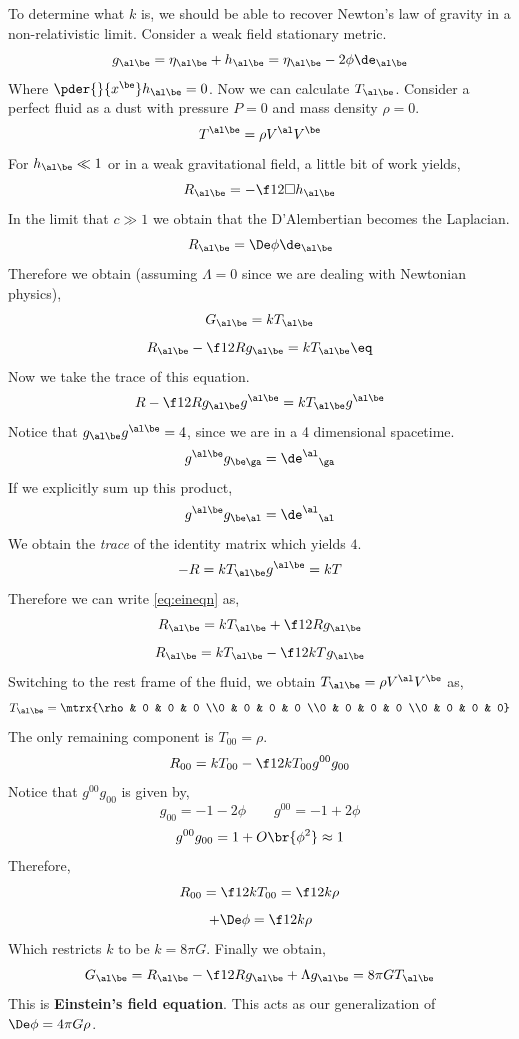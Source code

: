 \documentclass{article}
\begin{document}
To determine what $k$ is, we should be able to recover Newton's law of gravity in a non-relativistic limit. Consider a weak field stationary metric.
\[ g_{\al\be} = \eta_{\al\be} + h_{\al\be} = \eta_{\al\be} -2 \phi\de_{\al\be}\]
Where $\pder{}{x^\be} h_{\al\be} = 0$. Now we can calculate $T_{\al\be}$. Consider a perfect fluid as a dust with pressure $P= 0$ and mass density $\rho=0$.
\[ T^{\al\be} = \rho V^\al V^\be \]
For $h_{\al\be} \ll 1$ or in a weak gravitational field, a little bit of work yields,
\[ R_{\al\be} = -\f12 \Box h_{\al\be} \]
In the limit that $c \gg 1$ we obtain that the D'Alembertian becomes the Laplacian.
\[ R_{\al\be} = \De \phi \de_{\al\be} \]
Therefore we obtain (assuming $\Lambda = 0$ since we are dealing with Newtonian physics),
\[ G_{\al\be} = k T_{\al\be} \]
\[ R_{\al\be} - \f12 R g_{\al\be} = k T_{\al\be} \eq \label{eq:eineqn}\]
Now we take the trace of this equation.
\[ R - \f12 R g_{\al\be} g^{\al\be} = k T_{\al\be}g^{\al\be} \]
Notice that $g_{\al\be} g^{\al\be} = 4$, since we are in a 4 dimensional spacetime.
\[ g^{\al\be} g_{\be\ga} = {\de^\al}_{\ga} \]
If we explicitly sum up this product,
\[ g^{\al\be} g_{\be\al} = {\de^\al}_{\al} \]
We obtain the \textit{trace} of the identity matrix which yields $4$.
\[ -R = k T_{\al\be}g^{\al\be} = kT \]
Therefore we can write \eqref{eq:eineqn} as,
\[ R_{\al\be} = k T_{\al\be} + \f12 R g_{\al\be} \]
\[ R_{\al\be} = k T_{\al\be} - \f12 k T g_{\al\be} \]
Switching to the rest frame of the fluid, we obtain $T_{\al\be} = \rho V^\al V^\be$ as,
\[ T_{\al\be} = \mtrx{\rho & 0 & 0 & 0 \\0 & 0 & 0 & 0 \\0 & 0 & 0 & 0 \\0 & 0 & 0 & 0} \]
The only remaining component is $T_{00} = \rho$.
\[ R_{00} = k T_{00} - \f12 k T_{00} g^{00} g_{00}\]
Notice that $g^{00}g_{00}$ is given by,
\[ g_{00} = -1 - 2 \phi \qquad g^{00} = -1 + 2 \phi \]
\[ g^{00}g_{00} = 1 + O\br{\phi^2} \approx 1 \]
Therefore,
\[ R_{00} = \f12 k T_{00} = \f12 k \rho \]
\[ +\De \phi = \f12 k \rho \]
Which restricts $k$ to be $k = 8 \pi G$. Finally we obtain,
\[ G_{\al\be} = R_{\al\be} - \f12 R g_{\al\be} + \Lambda g_{\al\be} = 8 \pi G T_{\al\be} \]
This is \textbf{Einstein's field equation}. This acts as our generalization of $\De \phi = 4 \pi G \rho$.
\end{document}
